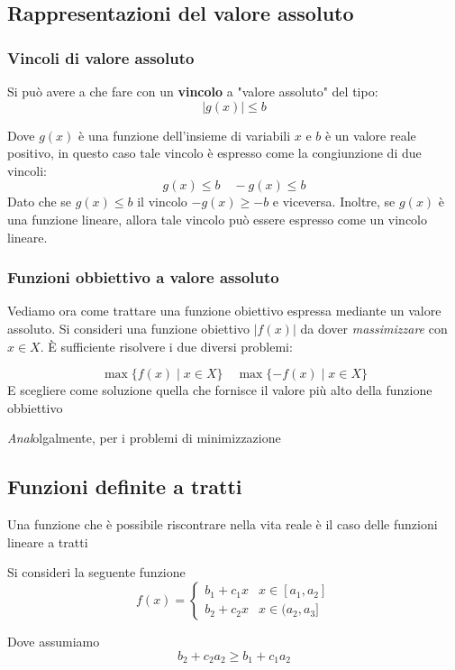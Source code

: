 \subsection{Rappresentazioni del valore assoluto}

\subsubsection{Vincoli di valore assoluto}
Si può avere a che fare con un \textbf{vincolo} a "valore assoluto" del tipo:
\[
  |g(x)| \leq b
\]

Dove $g(x)$ è una funzione dell'insieme di variabili $x$ e $b$ è un valore reale positivo, in questo caso tale vincolo è espresso come la congiunzione di due vincoli:
\[
  g(x)\leq b \quad -g(x)\leq b
\]
Dato che se $g(x)\leq b$ il vincolo $-g(x)\geq -b$ e viceversa. Inoltre, se $g(x)$ è una funzione lineare, allora tale vincolo può essere espresso come un vincolo lineare.

\subsubsection{Funzioni obbiettivo a valore assoluto}
Vediamo ora come trattare una funzione obiettivo espressa mediante un valore assoluto. Si consideri una funzione obiettivo $|f(x)|$ da dover \textit{massimizzare} con $x\in X$. È sufficiente risolvere i due diversi problemi:

\[
  \max \{f(x)\mid x \in X\} \quad \max \{-f(x)\mid x \in X\}
\]
E scegliere come soluzione quella che fornisce il valore più alto della funzione obbiettivo

\textit{Anal}olgalmente, per i problemi di minimizzazione

\subsection{Funzioni definite a tratti}
Una funzione che è possibile riscontrare nella vita reale è il caso delle funzioni lineare a tratti

Si consideri la seguente funzione 
\begin{equation}
  f(x) = \begin{cases}
    b_1 + c_1x & x \in [a_1, a_2]\\
    b_2+c_2x & x \in (a_2, a_3]
  \end{cases}
\end{equation}

Dove assumiamo 
\[
  b_2 + c_2a_2 \geq b_1 + c_1a_2
\]

